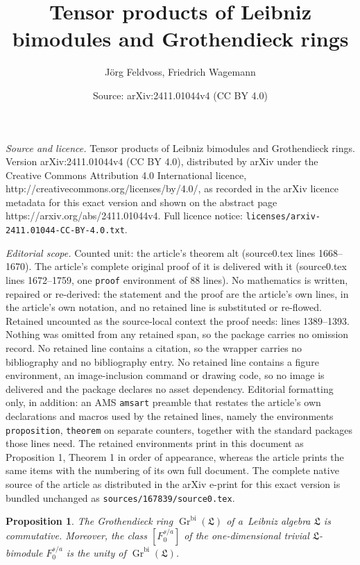 \documentclass[10pt,a4paper]{amsart}
\title{Tensor products of Leibniz bimodules and Grothendieck rings}
\author{J\"org Feldvoss, Friedrich Wagemann}
\date{Source: arXiv:2411.01044v4 (CC BY 4.0)}
\newtheorem{proposition}{Proposition}
\DeclareMathOperator{\K}{Gr}
\DeclareMathOperator{\bi}{bi}
\newcommand{\lf}{\mathfrak{L}}
\begin{document}
\maketitle

\noindent\emph{Source and licence.} Tensor products of Leibniz bimodules and Grothendieck rings. Version arXiv:2411.01044v4 (CC BY 4.0), distributed by arXiv under the Creative Commons Attribution 4.0 International licence, http://creativecommons.org/licenses/by/4.0/, as recorded in the arXiv licence metadata for this exact version and shown on the abstract page https://arxiv.org/abs/2411.01044v4. Full licence notice: \texttt{licenses/arxiv-2411.01044-CC-BY-4.0.txt}.\par\smallskip

\noindent\textit{Editorial scope.} Counted unit: the article's theorem alt (source0.tex lines 1668--1670). The article's complete original proof of it is delivered with it (source0.tex lines 1672--1759, one \texttt{proof} environment of 88 lines). No mathematics is written, repaired or re-derived: the statement and the proof are the article's own lines, in the article's own notation, and no retained line is substituted or re-flowed.  Retained uncounted as the source-local context the proof needs: lines 1389--1393.  Nothing was omitted from any retained span, so the package carries no omission record.  No retained line contains a citation, so the wrapper carries no bibliography and no bibliography entry.  No retained line contains a figure environment, an image-inclusion command or drawing code, so no image is delivered and the package declares no asset dependency.  Editorial formatting only, in addition: an AMS \texttt{amsart} preamble that restates the article's own declarations and macros used by the retained lines, namely the environments \texttt{proposition}, \texttt{theorem} on separate counters, together with the standard packages those lines need.  The retained environments print in this document as Proposition 1, Theorem 1 in order of appearance, whereas the article prints the same items with the numbering of its own full document.  The complete native source of the article as distributed in the arXiv e-print for this exact version is bundled unchanged as \texttt{sources/167839/source0.tex}.
	\begin{proposition}\label{unitalcomm}
		The Grothendieck ring $\K^{\bi}(\lf)$ of a~Leibniz algebra $\lf$
		is commutative. Moreover, the class $[F_0^{s/a}]$ of the one-dimensional trivial $\lf$-bimodule $F_0^{s/a}$ is the unity of
		$\K^{\bi}(\lf)$.
	\end{proposition}
\end{document}
